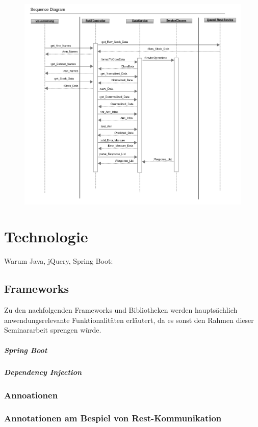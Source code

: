 \begin{figure}
\includegraphics[width=15cm]{sequence_dia_rest_env.png}
\end{figure}


\section{Technologie}
Warum Java, jQuery, Spring Boot: 

\subsection{Frameworks}
Zu den nachfolgenden Frameworks und Bibliotheken werden hauptsächlich anwendungsrelevante Funktionalitäten erläutert, da es sonst den Rahmen dieser Seminararbeit sprengen würde.

\subparagraph{Spring Boot}

\subparagraph{Dependency Injection}

\subsubsection{Annoationen}

\subsubsection{Annotationen am Bespiel von Rest-Kommunikation}

